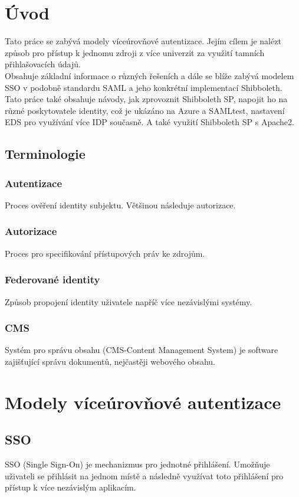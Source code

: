 \chapter{Úvod}
Tato práce se zabývá modely víceúrovňové autentizace. Jejím cílem je nalézt způsob pro přístup k jednomu zdroji z více univerzit za využití tamních přihlašovacích údajů.\\
Obsahuje základní informace o různých řešeních a dále se blíže zabývá modelem SSO v podobně standardu SAML a jeho konkrétní implementací Shibboleth.\\
Tato práce také obsahuje návody, jak zprovoznit Shibboleth SP, napojit ho na různé poskytovatele identity, což je ukázáno na Azure a SAMLtest, nastavení EDS pro využívání více IDP současně. A také využití Shibboleth SP s Apache2.\\


\section{Terminologie}
\subsection{Autentizace}
Proces ověření identity subjektu. Většinou následuje autorizace.\cite{Authorization}
\subsection{Autorizace}
Proces pro specifikování přístupových práv ke zdrojům.\cite{Autentizace}
 \subsection{Federované identity}
Způsob propojení identity uživatele napříč více nezávislými systémy. \cite{federatedIdentities}
\subsection{CMS} %
Systém pro správu obsahu (CMS-Content Management System) je software zajišťující správu dokumentů, nejčastěji webového obsahu.\cite{cms}

\chapter{Modely víceúrovňové autentizace}
\section{SSO}
\label{sso}
SSO (Single Sign-On) je mechanizmus pro jednotné přihlášení. Umožňuje uživateli se přihlásit na jednom místě a následně využívat toto přihlášení pro přístup k více nezávislým aplikacím. \cite{SSO}

